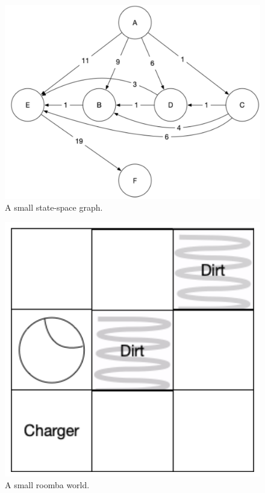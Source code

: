 \documentclass{article} %
\begin{document}
\begin{figure}
\begin{center}
\includegraphics[height=0.3\textheight]{graph-fig}
\caption{A small state-space graph.}
\label{graph-fig}
\end{center}
\end{figure}

\begin{figure}
\begin{center}
\includegraphics[height=0.3\textheight]{roomba-world}
\caption{A small roomba world.}
\label{roomba-world}
\end{center}
\end{figure}
\end{document}
